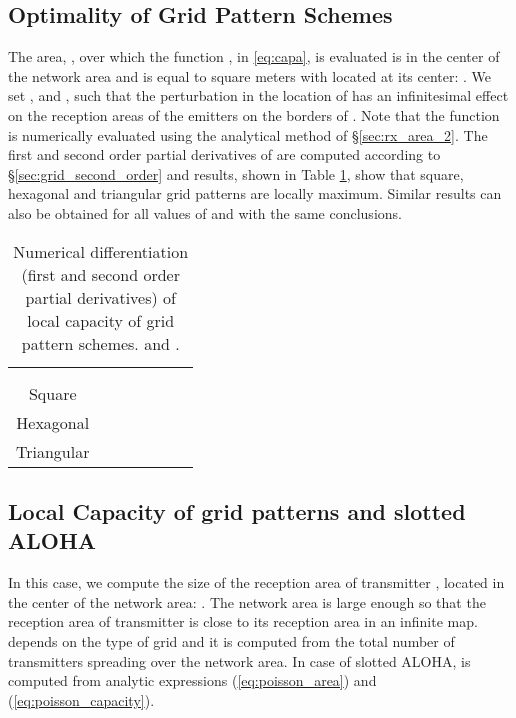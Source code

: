 \documentclass[12pt,english]{article}
\begin{document}
\subsection{Optimality of Grid Pattern Schemes}
\label{sec:sub_opti}

The area, , over which the function , in \eqref{eq:capa}, is evaluated is in the center of the network area and is equal to \mbox{} square meters with  located at its center: \mbox{}. We set \mbox{}, \mbox{} and \mbox{}, such that the perturbation in the location of  has an infinitesimal effect on the reception areas of the emitters on the borders of . Note that the function  is numerically evaluated using the analytical method of \S \ref{sec:rx_area_2}. The first and second order partial derivatives of  are computed according to \S \ref{sec:grid_second_order} and results, shown in Table \ref{tbl:comparison}, show that square, hexagonal and triangular grid patterns are locally maximum. Similar results can also be obtained for all values of  and  with the same conclusions.

{\small 
\begin{table}[!t]
\begin{center}
\begin{tabular}{|c|c|c|c|c|c|c|}
\hline
     & 	& 	& 	& 	&  	& \\
     &		&		&		& 	&		&		\\
   \hline

    Square   	  &   &     &  &  &  &  \\
    \hline
    Hexagonal  &   &     &  &  &  &  \\
    \hline
    Triangular   &   &     &  &  &  &  \\
       \hline
\end{tabular}
\end{center}
\caption{\footnotesize Numerical differentiation (first and second order partial derivatives) of local capacity of grid pattern schemes.  and .}
\label{tbl:comparison}
\end{table}
}

\subsection{Local Capacity of grid patterns and slotted ALOHA}

In this case, we compute the size of the reception area of transmitter , located in the center of the network area: \mbox{}. The network area is large enough so that the reception area of transmitter  is close to its reception area in an infinite map.  depends on the type of grid and it is computed from the total number of transmitters spreading over the network area. In case of slotted ALOHA,  is computed from analytic expressions (\ref{eq:poisson_area}) and (\ref{eq:poisson_capacity}).
\end{document}
